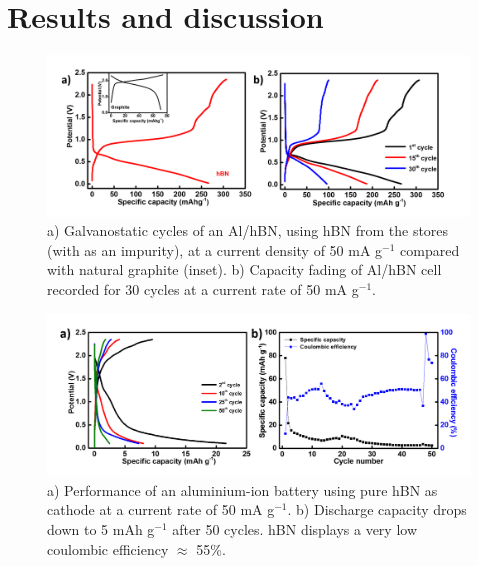 \section{Results and discussion}

\begin{figure}[tbh!]
\centering
\includegraphics[width=\textwidth]{Figures/BOhBN/hBNiniCDC}
\caption{a) Galvanostatic cycles of an Al/hBN, using hBN from the stores (with  as an impurity), at a current density of 50 mA g$^{-1}$ compared with natural graphite (inset). b) Capacity fading of Al/hBN cell recorded for 30 cycles at a current rate of 50 mA g$^{-1}$.}
\label{Figures/BOhBN:hBNiniCDC}
\end{figure}

\begin{figure}[tbh!]
\centering
\includegraphics[width=\textwidth]{Figures/BOhBN/BNNSCDCCE}
\caption{a) Performance of an aluminium-ion battery using pure hBN as cathode at a current rate of 50 mA g$^{-1}$. b) Discharge capacity drops down to 5 mAh g$^{-1}$ after 50 cycles. hBN displays a very low coulombic efficiency $\approx$ 55\%.}
\label{Figures/BOhBN:hBNCDCCE}
\end{figure}

